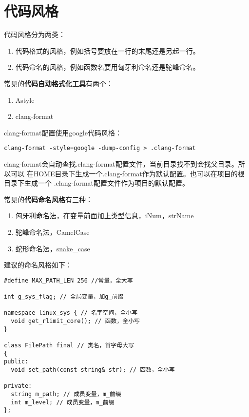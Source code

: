 \chapter{代码风格}

代码风格分为两类：

\begin{enumerate}
  \item 代码格式的风格，例如括号要放在一行的末尾还是另起一行。
  \item 代码命名的风格，例如函数名要用匈牙利命名还是驼峰命名。
\end{enumerate}

常见的\textbf{代码自动格式化工具}有两个：

\begin{enumerate}
  \item Astyle
  \item clang-format
\end{enumerate}

clang-format配置使用google代码风格：

\begin{verbatim}
clang-format -style=google -dump-config > .clang-format
\end{verbatim}

clang-format会自动查找.clang-format配置文件，当前目录找不到会找父目录。所以可以
在HOME目录下生成一个.clang-format作为默认配置。也可以在项目的根目录下生成一个
.clang-format配置文件作为项目的默认配置。

常见的\textbf{代码命名风格}有三种：

\begin{enumerate}
  \item 匈牙利命名法，在变量前面加上类型信息，iNum，strName
  \item 驼峰命名法，CamelCase
  \item 蛇形命名法，snake\_case
\end{enumerate}

建议的命名风格如下：

\begin{verbatim}
#define MAX_PATH_LEN 256 //常量，全大写

int g_sys_flag; // 全局变量，加g_前缀

namespace linux_sys { // 名字空间，全小写
  void get_rlimit_core(); // 函数，全小写
}

class FilePath final // 类名，首字母大写
{
public:
  void set_path(const string& str); // 函数，全小写

private:
  string m_path; // 成员变量，m_前缀
  int m_level; // 成员变量，m_前缀
};
\end{verbatim}
